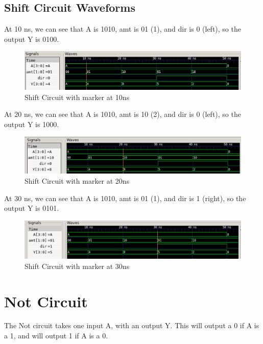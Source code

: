 \documentclass[12pt]{article}
\begin{document}
\subsection{Shift Circuit Waveforms}

At 10 ns, we can see that A is 1010, amt is 01 (1), and dir is 0 (left), so the output Y is 0100.
\begin{figure}[H]
    \centering
    \includegraphics[width = 1.0\textwidth]{2x4Shifter/shift_wave.PNG}
    \caption{Shift Circuit with marker at 10ns}
    \label{fig:shift-wave1}
\end{figure}

At 20 ns, we can see that A is 1010, amt is 10 (2), and dir is 0 (left), so the output Y is 1000.
\begin{figure}[H]
    \centering
    \includegraphics[width = 1.0\textwidth]{2x4Shifter/shift_wave1.PNG}
    \caption{Shift Circuit with marker at 20ns}
    \label{fig:shift-wave2}
\end{figure}

At 30 ns, we can see that A is 1010, amt is 01 (1), and dir is 1 (right), so the output Y is 0101.
\begin{figure}[H]
    \centering
    \includegraphics[width = 1.0\textwidth]{2x4Shifter/shift_wave2.PNG}
    \caption{Shift Circuit with marker at 30ns}
    \label{fig:shift-wave3}
\end{figure}

\section{Not Circuit}
The Not circuit takes one input A, with an output Y. This will output a 0 if A is a 1, and will output 1 if A is a 0.
\end{document}
